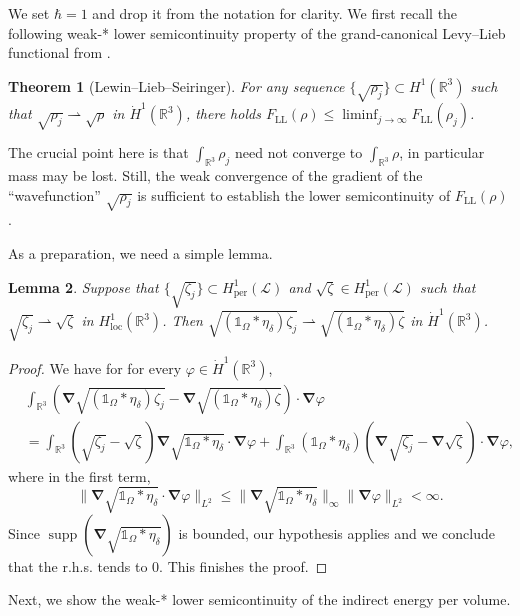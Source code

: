 \documentclass[final,onefignum,onetabnum,reqno]{amsart}
\newtheorem{theorem}{Theorem}[section]
\newtheorem{lemma}[theorem]{Lemma}
\theoremstyle{remark}
\renewcommand{\le}{\leqslant}
\let\phi=\varphi
\DeclareMathOperator{\supp}{supp}
\newcommand{\RR}{\mathbb{R}}
\newcommand{\per}{\mathrm{per}} %
\newcommand{\LL}{\mathrm{LL}} %
\newcommand{\wconv}{\rightharpoonup} %
\newcommand{\iden}{\mathbb{1}} %
\newcommand{\grad}{\bm{\nabla}} %
\newcommand{\Hloc}{H_{\mathrm{loc}}} %
\newcommand{\LC}{\mathcal{L}}
\begin{document}
We set $\hbar=1$ and drop it from the notation for clarity. We first recall the following weak-* lower semicontinuity property of the grand-canonical Levy--Lieb functional from \cite{lewin2019universal}.
\begin{theorem}[Lewin--Lieb--Seiringer]\label{Flsc}
For any sequence $\{\sqrt{\rho_j}\}\subset H^1(\RR^3)$ such that $\sqrt{\rho_j}\wconv \sqrt{\rho}$ in $\dot{H}^1(\RR^3)$, there holds
$F_\LL(\rho)\le \liminf_{j\to\infty} F_\LL(\rho_j)$.
\end{theorem}
The crucial point here is that $\int_{\RR^3}\rho_j$ need not converge to $\int_{\RR^3}\rho$, in particular mass may be lost. 
Still, the weak convergence of the gradient of the ``wavefunction'' $\sqrt{\rho_j}$ is sufficient to establish the lower semicontinuity of $F_\LL(\rho)$.

As a preparation, we need a simple lemma.
\begin{lemma}\label{wconvlemm}
Suppose that $\{\sqrt{\zeta_j}\}\subset H^1_\per(\LC)$ and $\sqrt{\zeta}\in H^1_\per(\LC)$ such that 
$\sqrt{\zeta_j}\wconv\sqrt{\zeta}$ in $\Hloc^1(\RR^3)$.
Then $\sqrt{(\iden_\Omega*\eta_\delta)\zeta_j}\wconv \sqrt{(\iden_\Omega*\eta_\delta)\zeta}$
in $\dot{H}^1(\RR^3)$.
\end{lemma}
\begin{proof}
We have for for every $\phi\in \dot{H}^1(\RR^3)$,
\begin{align*}
&\int_{\RR^3} \left(\grad\sqrt{(\iden_\Omega*\eta_\delta)\zeta_j} - \grad\sqrt{(\iden_\Omega*\eta_\delta)\zeta}\right)\cdot\grad\phi\\
&=\int_{\RR^3} (\sqrt{\zeta_j}-\sqrt{\zeta})\grad\sqrt{\iden_\Omega*\eta_\delta}\cdot\grad\phi+
\int_{\RR^3} (\iden_\Omega*\eta_\delta)\left(\grad\sqrt{\zeta_j} -\grad\sqrt{\zeta}\right)\cdot\grad\phi,
\end{align*}
where in the first term, 
$$
\|\grad\sqrt{\iden_\Omega*\eta_\delta}\cdot\grad\phi\|_{L^2}\le \|\grad\sqrt{\iden_\Omega*\eta_\delta}\|_{\infty} \|\grad\phi\|_{L^2}<\infty.
$$
Since $\supp(\grad\sqrt{\iden_\Omega*\eta_\delta})$ is bounded, our hypothesis applies and we conclude that the r.h.s. tends to 0. This finishes the proof. 
\end{proof}

Next, we show the weak-* lower semicontinuity of the indirect energy per volume.
\end{document}
